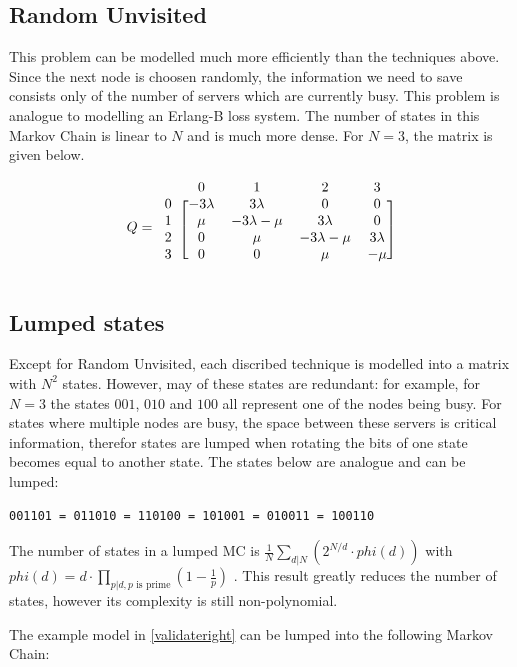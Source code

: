 \documentclass[10pt,a4paper,titlepage]{article}
\begin{document}
\subsection{Random Unvisited}
This problem can be modelled much more efficiently than the techniques above. Since the next node is choosen randomly, the information we need to save consists only of the number of servers which are currently busy. This problem is analogue to modelling an Erlang-B loss system. The number of states in this Markov Chain is linear to $N$ and is much more dense. For $N=3$, the matrix is given below.

\[ Q =
  \begin{blockarray}{ccccc}
    & 0 & 1 & 2 & 3 \\
    \begin{block}{c[cccc]}
    0 & -3\lambda & 3\lambda & 0 & 0 \\
    1 & \mu & -3\lambda-\mu & 3\lambda & 0 \\
    2 & 0 & \mu & -3\lambda-\mu & 3\lambda \\
    3 & 0 & 0 & \mu & -\mu \\
    \end{block}
  \end{blockarray}
\]

\subsection{Lumped states}
\label{lump}

Except for Random Unvisited, each discribed technique is modelled into a matrix with $N^2$ states. However, may of these states are redundant: for example, for $N=3$ the states $001$, $010$ and $100$ all represent one of the nodes being busy. For states where multiple nodes are busy, the space between these servers is critical information, therefor states are lumped when rotating the bits of one state becomes equal to another state. The states below are analogue and can be lumped:
\begin{verbatim}
001101 = 011010 = 110100 = 101001 = 010011 = 100110
\end{verbatim}

The number of states in a lumped MC is $\frac{1}{N} \sum_{d|N} (2^{N/d} \cdot phi(d) )$ with $phi(d) = d \cdot \prod_{p|d, p\text{ is prime}} (1-\frac{1}{p})$ \cite{A000031}. This result greatly reduces the number of states, however its complexity is still non-polynomial.

The example model in \ref{validateright} can be lumped into the following Markov Chain:
\end{document}
